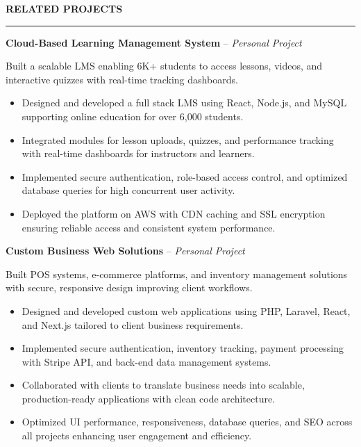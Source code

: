 \documentclass[10pt,letterpaper]{article}
\begin{document}
\vspace{6pt}

\textbf{RELATED PROJECTS}\\[-8pt]
\noindent\rule{\textwidth}{1pt}

\vspace{-2pt}

\textbf{Cloud-Based Learning Management System} -- \emph{Personal Project}

\vspace{-1pt}

Built a scalable LMS enabling 6K+ students to access lessons, videos, and interactive quizzes with real-time tracking dashboards.
\vspace{-1pt}
\begin{itemize}
\item Designed and developed a full stack LMS using React, Node.js, and MySQL supporting online education for over 6,000 students.
\item Integrated modules for lesson uploads, quizzes, and performance tracking with real-time dashboards for instructors and learners.
\item Implemented secure authentication, role-based access control, and optimized database queries for high concurrent user activity.
\item Deployed the platform on AWS with CDN caching and SSL encryption ensuring reliable access and consistent system performance.
\end{itemize}

\textbf{Custom Business Web Solutions} -- \emph{Personal Project}

\vspace{-1pt}

Built POS systems, e-commerce platforms, and inventory management solutions with secure, responsive design improving client workflows.
\vspace{-1pt}
\begin{itemize}
\item Designed and developed custom web applications using PHP, Laravel, React, and Next.js tailored to client business requirements.
\item Implemented secure authentication, inventory tracking, payment processing with Stripe API, and back-end data management systems.
\item Collaborated with clients to translate business needs into scalable, production-ready applications with clean code architecture.
\item Optimized UI performance, responsiveness, database queries, and SEO across all projects enhancing user engagement and efficiency.
\end{itemize}
\end{document}
